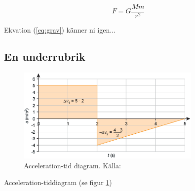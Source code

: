 \documentclass[11p]{article}
\begin{document}
\begin{equation}
    F = G \frac{M m}{r^2}
    \label{eq:grav}
\end{equation}

Ekvation (\ref{eq:grav}) känner ni igen...
\clearpage
\subsection{En underrubrik}
    \begin{figure}[!h]
        \includegraphics[width=0.8\textwidth]{accelerationTime.png}
        \caption{Acceleration-tid diagram. Källa: \textcite{Fraenkel}}
        \label{fig:acc}
    \end{figure}

Acceleration-tiddiagram (se figur \ref{fig:acc})

\printbibliography
\end{document}
